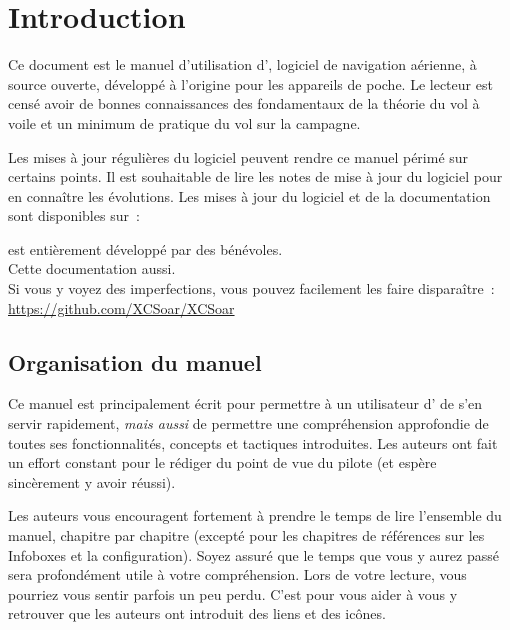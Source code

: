 
\chapter{Introduction}\label{cha:introduction}
Ce document est le manuel d'utilisation d'\xc, logiciel de navigation aérienne, à source ouverte, développé à l'origine pour les appareils de poche. Le lecteur est censé avoir de bonnes connaissances des fondamentaux de la théorie du vol à voile et un minimum de pratique du vol sur la campagne.

Les mises à jour régulières du logiciel peuvent rendre ce manuel périmé sur certains points. Il est souhaitable de lire les notes de mise à jour du logiciel pour en connaître les évolutions. Les mises à jour du logiciel et de la documentation sont disponibles sur~:
\begin{quote}
\end{quote}

\begin{framed}
	\begin{center}
		\xc{} est entièrement développé par des bénévoles.\\
		Cette documentation aussi.\\
		Si vous y voyez des imperfections, vous pouvez facilement les faire disparaître~:\\
		\url{https://github.com/XCSoar/XCSoar}
	\end{center}
\end{framed}

\section{Organisation du manuel}

Ce manuel est principalement écrit pour permettre à un utilisateur d'\xc{} de s'en servir
rapidement, \emph{mais aussi} de permettre une compréhension approfondie de toutes ses fonctionnalités,
concepts et tactiques introduites. Les auteurs ont fait un effort constant
pour le rédiger du point de vue du pilote (et espère sincèrement y avoir réussi).

Les auteurs vous encouragent fortement à prendre le temps de lire l'ensemble du manuel,
chapitre par chapitre (excepté pour les chapitres de références sur les Infoboxes et 
la configuration). Soyez assuré que le temps que vous y aurez passé sera profondément
utile à votre compréhension. Lors de votre lecture, vous pourriez vous sentir parfois un peu perdu.
C'est pour vous aider à vous y retrouver que les auteurs ont introduit des liens et des icônes.

